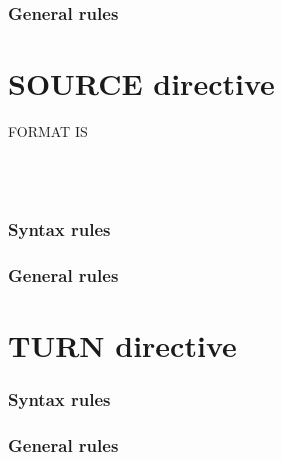 \subsubsection{General rules}

\section{SOURCE directive}

\begin{syntax}
  \directiveindicator{} FORMAT IS
  \begin{1=}
     \\
     \\
  \end{1=}
\end{syntax}

\subsubsection{Syntax rules}

\subsubsection{General rules}

\section{TURN directive}

\begin{syntax}
\end{syntax}

\subsubsection{Syntax rules}

\subsubsection{General rules}

